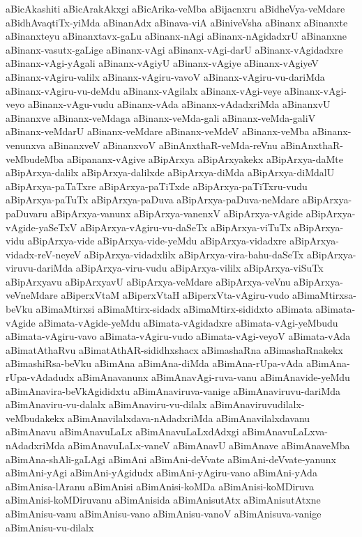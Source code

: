 {aBicAkashiti
aBicArakAkxgi
aBicArika-veMba
aBijacnxru
aBidheVya-veMdare
aBidhAvaqtiTx-yiMda
aBinanAdx
aBinava-viA
aBiniveVsha
aBinanx
aBinanxte
aBinanxteyu
aBinanxtavx-gaLu
aBinanx-nAgi
aBinanx-nAgidadxrU
aBinanxne
aBinanx-vasutx-gaLige
aBinanx-vAgi
aBinanx-vAgi-darU
aBinanx-vAgidadxre
aBinanx-vAgi-yAgali
aBinanx-vAgiyU
aBinanx-vAgiye
aBinanx-vAgiyeV
aBinanx-vAgiru-valilx
aBinanx-vAgiru-vavoV
aBinanx-vAgiru-vu-dariMda
aBinanx-vAgiru-vu-deMdu
aBinanx-vAgilalx
aBinanx-vAgi-veye
aBinanx-vAgi-veyo
aBinanx-vAgu-vudu
aBinanx-vAda
aBinanx-vAdadxriMda
aBinanxvU
aBinanxve
aBinanx-veMdaga
aBinanx-veMda-gali
aBinanx-veMda-galiV
aBinanx-veMdarU
aBinanx-veMdare
aBinanx-veMdeV
aBinanx-veMba
aBinanx-venunxva
aBinanxveV
aBinanxvoV
aBinAnxthaR-veMda-reVnu
aBinAnxthaR-veMbudeMba
aBipananx-vAgive
aBipArxya
aBipArxyakekx
aBipArxya-daMte
aBipArxya-dalilx
aBipArxya-dalilxde
aBipArxya-diMda
aBipArxya-diMdalU
aBipArxya-paTaTxre
aBipArxya-paTiTxde
aBipArxya-paTiTxru-vudu
aBipArxya-paTuTx
aBipArxya-paDuva
aBipArxya-paDuva-neMdare
aBipArxya-paDuvaru
aBipArxya-vanunx
aBipArxya-vanenxV
aBipArxya-vAgide
aBipArxya-vAgide-yaSeTxV
aBipArxya-vAgiru-vu-daSeTx
aBipArxya-viTuTx
aBipArxya-vidu
aBipArxya-vide
aBipArxya-vide-yeMdu
aBipArxya-vidadxre
aBipArxya-vidadx-reV-neyeV
aBipArxya-vidadxlilx
aBipArxya-vira-bahu-daSeTx
aBipArxya-viruvu-dariMda
aBipArxya-viru-vudu
aBipArxya-vililx
aBipArxya-viSuTx
aBipArxyavu
aBipArxyavU
aBipArxya-veMdare
aBipArxya-veVnu
aBipArxya-veVneMdare
aBiperxVtaM
aBiperxVtaH
aBiperxVta-vAgiru-vudo
aBimaMtirxsa-beVku
aBimaMtirxsi
aBimaMtirx-sidadx
aBimaMtirx-sididxto
aBimata
aBimata-vAgide
aBimata-vAgide-yeMdu
aBimata-vAgidadxre
aBimata-vAgi-yeMbudu
aBimata-vAgiru-vavo
aBimata-vAgiru-vudo
aBimata-vAgi-veyoV
aBimata-vAda
aBimatAthaRvu
aBimatAthAR-sididhxshacx
aBimashaRna
aBimashaRnakekx
aBimashiRsa-beVku
aBimAna
aBimAna-diMda
aBimAna-rUpa-vAda
aBimAna-rUpa-vAdadudx
aBimAnavanunx
aBimAnavAgi-ruva-vanu
aBimAnavide-yeMdu
aBimAnavira-beVkAgididxtu
aBimAnaviruva-vanige
aBimAnaviruvu-dariMda
aBimAnaviru-vu-dalalx
aBimAnaviru-vu-dilalx
aBimAnaviruvudilalx-veMbudakekx
aBimAnavilalxdava-nAdadxriMda
aBimAnavilalxdavanu
aBimAnavu
aBimAnavuLaLx
aBimAnavuLaLxdAdxgi
aBimAnavuLaLxva-nAdadxriMda
aBimAnavuLaLx-vaneV
aBimAnavU
aBimAnave
aBimAnaveMba
aBimAna-shAli-gaLAgi
aBimAni
aBimAni-deVvate
aBimAni-deVvate-yanunx
aBimAni-yAgi
aBimAni-yAgidudx
aBimAni-yAgiru-vano
aBimAni-yAda
aBimAnisa-lAranu
aBimAnisi
aBimAnisi-koMDa
aBimAnisi-koMDiruva
aBimAnisi-koMDiruvanu
aBimAnisida
aBimAnisutAtx
aBimAnisutAtxne
aBimAnisu-vanu
aBimAnisu-vano
aBimAnisu-vanoV
aBimAnisuva-vanige
aBimAnisu-vu-dilalx
}

